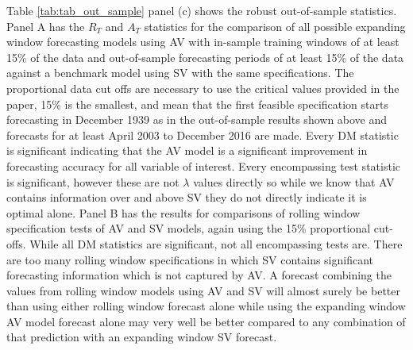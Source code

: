 Table \ref{tab:tab_out_sample} panel (c) shows the robust out-of-sample statistics. Panel A has the $R_{T}$ and $A_{T}$ statistics for the comparison of all possible expanding window forecasting models using AV with in-sample training windows of at least 15\% of the data and out-of-sample forecasting periods of at least 15\% of the data against a benchmark model using SV with the same specifications. The proportional data cut offs are necessary to use the critical values provided in the \citet{rossi_out--sample_2012} paper, 15\% is the smallest, and mean that the first feasible specification starts forecasting in December 1939 as in the out-of-sample results shown above and forecasts for at least April 2003 to December 2016 are made. Every DM statistic is significant indicating that the AV model is a significant improvement in forecasting accuracy for all variable of interest. Every encompassing test statistic is significant, however these are not $\lambda$ values directly so while we know that AV contains information over and above SV they do not directly indicate it is optimal alone. Panel B has the results for comparisons of rolling window specification tests of AV and SV models, again using the 15\% proportional cut-offs. While all DM statistics are significant, not all encompassing tests are. There are too many rolling window specifications in which SV contains significant forecasting information which is not captured by AV. A forecast combining the values from rolling window models using AV and SV will almost surely be better than using either rolling window forecast alone while using the expanding window AV model forecast alone may very well be better compared to any combination of that prediction with an expanding window SV forecast.